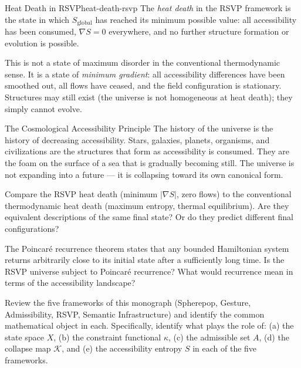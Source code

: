\begin{definition}{Heat Death in RSVP}{heat-death-rsvp}
  The \emph{heat death} in the RSVP framework is the state in which
  $S_\text{global}$ has reached its minimum possible value:
  all accessibility has been consumed, $\nabla S = 0$ everywhere,
  and no further structure formation or evolution is possible.
\end{definition}

This is not a state of maximum disorder in the conventional thermodynamic
sense. It is a state of \emph{minimum gradient}: all accessibility
differences have been smoothed out, all flows have ceased, and the
field configuration is stationary. Structures may still exist (the
universe is not homogeneous at heat death); they simply cannot evolve.

\begin{namedthm}{The Cosmological Accessibility Principle}
  The history of the universe is the history of decreasing accessibility.
  Stars, galaxies, planets, organisms, and civilizations are the structures
  that form as accessibility is consumed. They are the foam on the surface
  of a sea that is gradually becoming still. The universe is not expanding
  into a future — it is collapsing toward its own canonical form.
\end{namedthm}

\begin{exercise}
  Compare the RSVP heat death (minimum $|\nabla S|$, zero flows)
  to the conventional thermodynamic heat death (maximum entropy,
  thermal equilibrium). Are they equivalent descriptions of the same
  final state? Or do they predict different final configurations?
\end{exercise}

\begin{exercise}
  The Poincaré recurrence theorem states that any bounded Hamiltonian
  system returns arbitrarily close to its initial state after a
  sufficiently long time. Is the RSVP universe subject to Poincaré
  recurrence? What would recurrence mean in terms of the accessibility
  landscape?
\end{exercise}

\begin{exercise}[title={Synthesis}]
  Review the five frameworks of this monograph (Spherepop, Gesture,
  Admissibility, RSVP, Semantic Infrastructure) and identify the
  common mathematical object in each. Specifically, identify what
  plays the role of:
  (a) the state space $X$,
  (b) the constraint functional $\kappa$,
  (c) the admissible set $A$,
  (d) the collapse map $\mathcal{K}$, and
  (e) the accessibility entropy $S$
  in each of the five frameworks.
\end{exercise}
